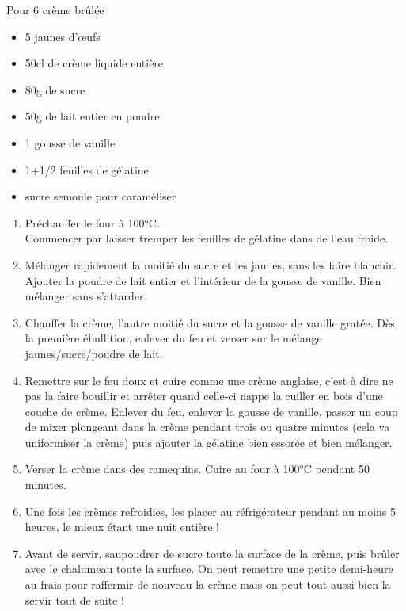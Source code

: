 \bigskip
{}
{Pour 6 crème brûlée}{\begin{itemize}
\item 5 jaunes d'œufs
\item 50cl de crème liquide entière
\item 80g de sucre
\item 50g de lait entier en poudre
\item 1 gousse de vanille
\item 1+1/2 feuilles de gélatine
\item sucre semoule pour caraméliser
\end{itemize}}
{\begin{enumerate}
\item Préchauffer le four à 100°C.\\
Commencer par laisser tremper les feuilles de gélatine dans de l'eau froide.
\item Mélanger rapidement la moitié du sucre et les jaunes, sans les faire blanchir. Ajouter la poudre de lait entier et l'intérieur de la gousse de vanille. Bien mélanger sans s'attarder.
\item Chauffer la crème, l'autre moitié du sucre et la gousse de vanille gratée. Dès la première ébullition, enlever du feu et verser sur le mélange jaunes/sucre/poudre de lait.
\item Remettre sur le feu doux et cuire comme une crème anglaise, c'est à dire ne pas la faire bouillir et arrêter quand celle-ci nappe la cuiller en bois d'une couche de crème. Enlever du feu, enlever la gousse de vanille, passer un coup de mixer plongeant dans la crème pendant trois ou quatre minutes (cela va uniformiser la crème) puis ajouter la gélatine bien essorée et bien mélanger.
\item Verser la crème dans des ramequins. Cuire au four à 100°C pendant 50 minutes.
\item Une fois les crèmes refroidies, les placer au réfrigérateur pendant au moins 5 heures, le mieux étant une nuit entière !
\item Avant de servir, saupoudrer de sucre toute la surface de la crème, puis brûler avec le chalumeau toute la surface. On peut remettre une petite demi-heure au frais pour raffermir de nouveau la crème mais on peut tout aussi bien la servir tout de suite !
\end{enumerate}}

